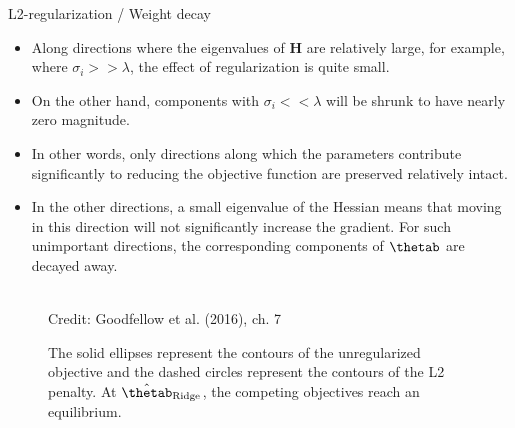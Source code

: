 \begin{vbframe}{L2-regularization / Weight decay}
\begin{itemize}
  \framebreak
    
  \item Along directions where the eigenvalues of $\bm{H}$ are relatively large, for example, where $\sigma_i >> \lambda$, the effect of regularization is quite small.
  \item On the other hand, components with $\sigma_i << \lambda$ will be shrunk to have nearly zero magnitude.
  \item In other words, only directions along which the parameters contribute significantly to reducing the objective function are preserved relatively intact.
  \item In the other directions, a small eigenvalue of the Hessian means that moving in this direction will not significantly increase the gradient. For such unimportant directions, the corresponding components of $\thetab$ are decayed away.
  \end{itemize}
  
  \framebreak
  
  \begin{figure}
    \centering
      \tiny{\\ Credit: Goodfellow et al. (2016), ch. 7}
      \caption{\footnotesize The solid ellipses represent the contours of the unregularized objective and the dashed circles represent the contours of the L2 penalty. At $\hat{\thetab}_{\text{Ridge}}$, the competing objectives reach an equilibrium.}
  \end{figure}
  \small
  

\end{vbframe}
